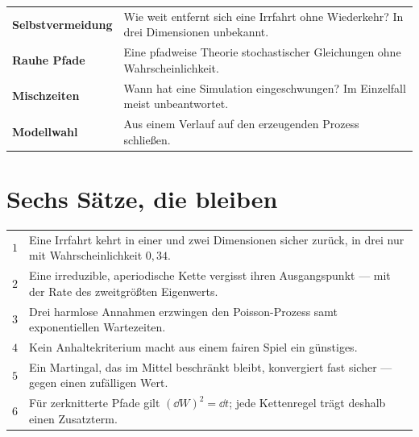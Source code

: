 \begin{merksatz}
\begin{center}
{\small
\renewcommand{\arraystretch}{1.55}
\begin{tabular}{@{}P{3.0cm}P{5.6cm}@{}}
\toprule
\textbf{Selbstvermeidung} & Wie weit entfernt sich eine Irrfahrt ohne Wiederkehr? In drei Dimensionen unbekannt.\\
\textbf{Rauhe Pfade} & Eine pfadweise Theorie stochastischer Gleichungen ohne Wahrscheinlichkeit.\\
\textbf{Mischzeiten} & Wann hat eine Simulation eingeschwungen? Im Einzelfall meist unbeantwortet.\\
\textbf{Modellwahl} & Aus einem Verlauf auf den erzeugenden Prozess schließen.\\
\bottomrule
\end{tabular}}
\end{center}

\begin{center}
\begin{minipage}{0.88\textwidth}
\end{minipage}
\end{center}
\end{merksatz}

\section{Sechs Sätze, die bleiben}

\begin{merksatz}
\begin{center}
{\small
\renewcommand{\arraystretch}{1.55}
\begin{tabular}{@{}P{0.7cm}P{7.7cm}@{}}
\toprule
$1$ & Eine Irrfahrt kehrt in einer und zwei Dimensionen sicher zurück, in drei nur mit Wahrscheinlichkeit $0{,}34$.\\
$2$ & Eine irreduzible, aperiodische Kette vergisst ihren Ausgangspunkt --- mit der Rate des zweitgrößten Eigenwerts.\\
$3$ & Drei harmlose Annahmen erzwingen den Poisson-Prozess samt exponentiellen Wartezeiten.\\
$4$ & Kein Anhaltekriterium macht aus einem fairen Spiel ein günstiges.\\
$5$ & Ein Martingal, das im Mittel beschränkt bleibt, konvergiert fast sicher --- gegen einen zufälligen Wert.\\
$6$ & Für zerknitterte Pfade gilt $(\dd W)^{2} = \dd t$; jede Kettenregel trägt deshalb einen Zusatzterm.\\
\bottomrule
\end{tabular}}
\end{center}
\end{merksatz}


